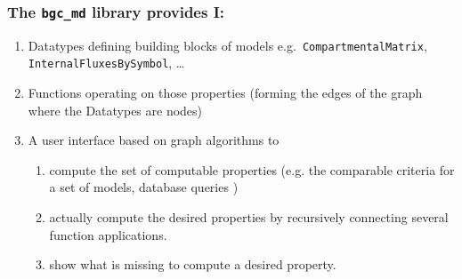 \documentclass[unknownkeysallowed,usepdftitle=false]{beamer}
\begin{document}
\begin{frame}
  \frametitle{The \texttt{bgc\_md} library provides I:}
  
  \begin{enumerate}
    \item
      Datatypes defining building blocks of models e.g.\ \texttt{CompartmentalMatrix}, \texttt{InternalFluxesBySymbol}, \dots     
    \item
      Functions operating on those properties (forming the edges of the graph where the Datatypes are nodes) 
    \item
      A user interface based on graph algorithms to  
    \begin{enumerate}
      \item
        compute the set of computable properties (e.g. the comparable criteria for a set of models, database queries ) 
      \item
        actually compute the desired properties by recursively connecting several function applications.
      \item
        show what is missing to compute a desired property.
    \end{enumerate}
  \end{enumerate}
\end{frame}
\end{document}
